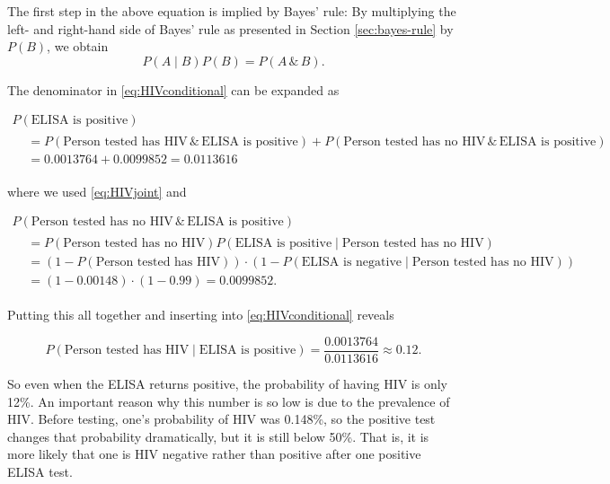 \documentclass[]{book}
\theoremstyle{definition}
\theoremstyle{definition}
\theoremstyle{definition}
\theoremstyle{remark}
\begin{document}
The first step in the above equation is implied by Bayes' rule: By
multiplying the left- and right-hand side of Bayes' rule as presented in
Section \ref{sec:bayes-rule} by \(P(B)\), we obtain \[
  P(A \mid B) P(B) = P(A \,\&\, B).
\]

The denominator in \eqref{eq:HIVconditional} can be expanded as

\begin{multline*}
  P(\text{ELISA is positive}) \\
  \begin{split}
  &= P(\text{Person tested has HIV} \,\&\, \text{ELISA is positive}) + P(\text{Person tested has no HIV} \,\&\, \text{ELISA is positive}) \\
  &= 0.0013764 + 0.0099852 = 0.0113616
  \end{split}
\end{multline*}

where we used \eqref{eq:HIVjoint} and

\begin{multline*}
  P(\text{Person tested has no HIV} \,\&\, \text{ELISA is positive}) \\
  \begin{split}
  &= P(\text{Person tested has no HIV}) P(\text{ELISA is positive} \mid \text{Person tested has no HIV}) \\
  &= \left(1 - P(\text{Person tested has HIV})\right) \cdot \left(1 - P(\text{ELISA is negative} \mid \text{Person tested has no HIV})\right) \\
  &= \left(1 - 0.00148\right) \cdot \left(1 - 0.99\right) = 0.0099852.
  \end{split}
\end{multline*}

Putting this all together and inserting into \eqref{eq:HIVconditional}
reveals

\begin{equation}
  P(\text{Person tested has HIV} \mid \text{ELISA is positive}) = \frac{0.0013764}{0.0113616} \approx 0.12.
  \label{eq:HIVresult}
\end{equation}

So even when the ELISA returns positive, the probability of having HIV
is only 12\%. An important reason why this number is so low is due to
the prevalence of HIV. Before testing, one's probability of HIV was
0.148\%, so the positive test changes that probability dramatically, but
it is still below 50\%. That is, it is more likely that one is HIV
negative rather than positive after one positive ELISA test.
\end{document}
